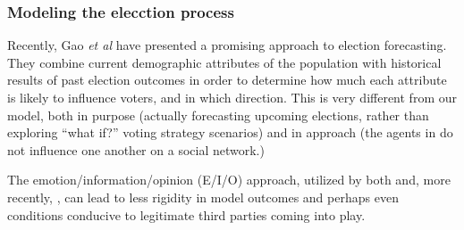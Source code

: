 


\subsubsection{Modeling the elecction process}
Recently, Gao \textit{et al}\cite{gao_forecasting_2022} have presented a
promising approach to election forecasting. They combine current demographic
attributes of the population with historical results of past election outcomes
in order to determine how much each attribute is likely to influence voters,
and in which direction. This is very different from our model, both in purpose
(actually forecasting upcoming elections, rather than exploring ``what if?''
voting strategy scenarios) and in approach (the agents in
\cite{gao_forecasting_2022} do not influence one another on a social network.)

The emotion/information/opinion (E/I/O) approach, utilized by both
\cite{sobkowicz_quantitative_2016} and, more recently,
\cite{burke_quantitatively_2022}, can lead to less rigidity in model outcomes
and perhaps even conditions conducive to legitimate third parties coming into
play.




